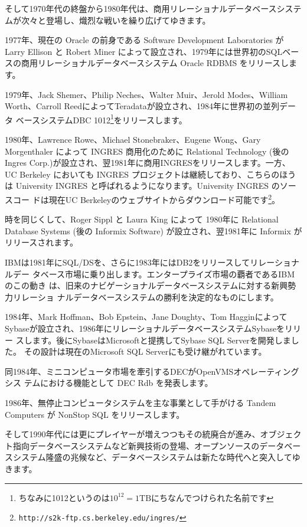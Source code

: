 そして1970年代の終盤から1980年代は、商用リレーショナルデータベースシステ
ムが次々と登場し、熾烈な戦いを繰り広げてゆきます。


1977年、現在の Oracle の前身である Software Development Laboratories が
Larry Ellison と Robert Miner によって設立され、1979年には世界初のSQLベー
スの商用リレーショナルデータベースシステム Oracle RDBMS をリリースします。


1979年、Jack Shemer、Philip Neches、Walter Muir、Jerold Modes、William
Worth、Carroll ReedによってTeradataが設立され、1984年に世界初の並列データ
ベースシステムDBC 1012\footnote{ちなみに1012というのは$10^{12} = 1 \mathrm{TB}$にちなんでつけられた名前です}をリリースします。


1980年、Lawrence Rowe、Michael Stonebraker、Eugene Wong、Gary
Morgenthaler によって INGRES 商用化のために Relational Technology (後の
Ingres Corp.)が設立され、翌1981年に商用INGRESをリリースします。一方、UC
Berkeley においても INGRES プロジェクトは継続しており、こちらのほうは
University INGRES と呼ばれるようになります。University INGRES のソースコー
ドは現在UC Berkeleyのウェブサイトからダウンロード可能です\footnote{\verb|http://s2k-ftp.cs.berkeley.edu/ingres/|}。


時を同じくして、Roger Sippl と Laura King によって 1980年に Relational
Database Systems (後の Informix Software) が設立され、翌1981年に
Informix がリリースされます。


IBMは1981年にSQL/DSを、さらに1983年にはDB2をリリースしてリレーショナルデー
タベース市場に乗り出します。エンタープライズ市場の覇者であるIBMのこの動き
は、旧来のナビゲーショナルデータベースシステムに対する新興勢力リレーショ
ナルデータベースシステムの勝利を決定的なものにします。


1984年、Mark Hoffman、Bob Epstein、Jane Doughty、Tom Hagginによって
Sybaseが設立され、1986年にリレーショナルデータベースシステムSybaseをリリー
スします。後にSybaseはMicrosoftと提携してSybase SQL Serverを開発しました。
その設計は現在のMicrosoft SQL Serverにも受け継がれています。


同1984年、ミニコンピュータ市場を牽引するDECがOpenVMSオペレーティングシス
テムにおける機能として DEC Rdb を発表します。


1986年、無停止コンピュータシステムを主な事業として手がける Tandem
Computers が NonStop SQL をリリースします。


そして1990年代には更にプレイヤーが増えつつもその統廃合が進み、オブジェク
ト指向データベースシステムなど新興技術の登場、オープンソースのデータベー
スシステム隆盛の兆候など、データベースシステムは新たな時代へと突入してゆ
きます。


